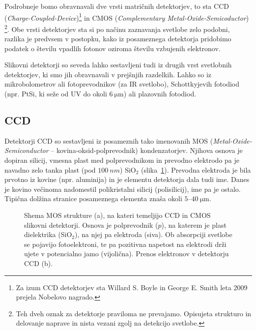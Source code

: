 Podrobneje bomo obravnavali dve vrsti matričnih detektorjev, to sta CCD 
({\it Charge-Coupled-Device})\footnote{Za izum CCD detektorjev sta Willard 
S. Boyle in George E. Smith  leta 2009 prejela Nobelovo nagrado.} 
in CMOS ({\it Complementary Metal-Oxide-Semicoductor})
\footnote{Teh dveh oznak za detektorje praviloma ne prevajamo. Opisujeta 
strukturo in delovanje naprave in nista vezani zgolj na detekcijo svetlobe.}. Obe vrsti
detektorjev sta si po načinu zaznavanja svetlobe zelo podobni, razlika
je predvsem v postopku, kako iz posameznega detektorja pridobimo podatek o številu 
vpadlih fotonov oziroma številu vzbujenih elektronov.

\begin{remark}
Slikovni detektorji so seveda lahko sestavljeni tudi iz drugih vrst svetlobnih detektorjev, 
ki smo jih obravnavali v prejšnjih razdelkih. Lahko so iz mikrobolometrov
ali fotoprevodnikov (za IR svetlobo),
Schottkyjevih fotodiod (npr. PtSi, ki seže od UV do
okoli $6~\si{\micro\meter}$) ali plazovnih fotodiod.
\end{remark}

\subsection*{CCD}
Detektorji CCD so sestavljeni iz posameznih tako imenovanih MOS 
({\it Metal-Oxide-Semiconductor}
-- kovina-oksid-polprevodnik) kondenzatorjev. Njihova osnova je dopiran silicij, vmesna 
plast med polprevodnikom in prevodno elektrodo pa je navadno zelo tanka plast (pod $100~\si{nm}$)
SiO$_2$ (slika~\ref{11_MOS}).
Prevodna elektroda je bila prvotno iz kovine (npr. aluminija) in je elementu detektorja dala tudi ime.
Danes je kovino večinoma nadomestil polikristalni silicij (polisilicij), ime pa je ostalo.
Tipična dolžina stranice posameznega elementa znaša okoli $5$--$40~\si{\micro\meter}$. 
\begin{figure}[h!]
\centering
\def\svgwidth{140truemm} 

\caption{Shema MOS strukture (a), na kateri temeljijo CCD in CMOS slikovni detektorji. Osnova je 
polprevodnik ($p$), na katerem je plast dielektrika (SiO$_2$), na njej pa elektroda (siva). 
Ob absorpciji svetlobe se pojavijo fotoelektroni, te pa pozitivna napetost
na elektrodi drži ujete v potencialno jamo (vijolična). Prenos elektronov v detektorju CCD (b).}
\label{11_MOS}
\end{figure}

